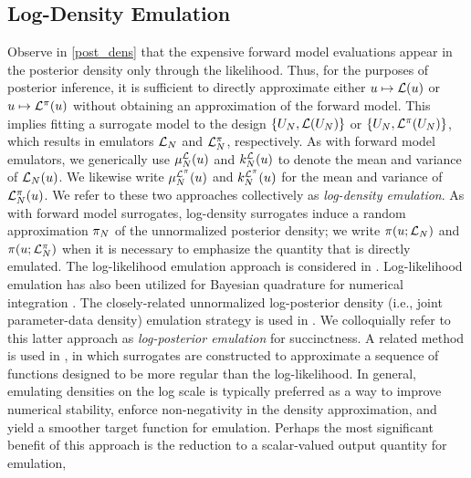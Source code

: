 \documentclass[12pt]{article}
\begin{document}
\subsection{Log-Density Emulation} \label{log_density_emulation}
Observe in \cref{post_dens} that the expensive forward model evaluations appear in the posterior density only through the 
likelihood. Thus, for the purposes of posterior inference, it is sufficient to directly approximate either
$\Par \mapsto \llik(\Par)$ or $\Par \mapsto \lpost(\Par)$ without obtaining an approximation of the forward model.
This implies fitting a surrogate model to the design $\{\designIn, \llik(\designIn)\}$ or $\{\designIn, \lpost(\designIn)\}$,
which results in emulators $\llikEm[\Ndesign]$ and $\lpostEm[\Ndesign]$, respectively.
As with forward model emulators, we generically use $\emMean[\Ndesign]{\llik}(\Par)$ and $\emKer[\Ndesign]{\llik}(\Par)$ 
to denote the mean and variance of $\llikEm[\Ndesign](\Par)$. We likewise write $\emMean[\Ndesign]{\lpost}(\Par)$ and 
$\emKer[\Ndesign]{\lpost}(\Par)$ for the mean and variance of $\lpostEm[\Ndesign](\Par)$.
We refer to these two approaches collectively as \textit{log-density emulation}.
As with forward model surrogates, log-density surrogates induce a random approximation $\postEm[\Ndesign]$ of the 
unnormalized posterior density; we write $\postDens(\Par; \llikEm[\Ndesign])$ and $\postDens(\Par; \lpostEm[\Ndesign])$
when it is necessary to emphasize the quantity that is directly emulated.
The log-likelihood emulation approach is considered in 
\citet{VehtariParallelGP,FATES_CES,trainDynamics,quantileApprox,ActiveLearningMCMC,FerEmulation,StuartTeck1,random_fwd_models,GP_PDE_priors,OakleyllikEm}.
Log-likelihood emulation has also been utilized for Bayesian quadrature for numerical 
integration \citep{BayesQuadrature,BayesQuadRatios}.
The closely-related unnormalized log-posterior density (i.e., joint parameter-data density) emulation
strategy is used in \citet{emPostDens,Kandasamy_2017,llikRBF,gp_surrogates_random_exploration,landslideCalibration}.
We colloquially refer to this latter approach as \textit{log-posterior emulation} for succinctness.
A related method is used in \citep{wang2018adaptive,adaptiveMultimodal}, in which surrogates are constructed 
to approximate a sequence of functions designed to be more regular than the log-likelihood.   
In general, emulating densities on the log scale is typically preferred as a way to improve numerical stability,
enforce non-negativity in the density approximation, and yield a smoother target function for emulation.
Perhaps the most significant benefit of this approach is the reduction to a scalar-valued output quantity for emulation,
\end{document}
